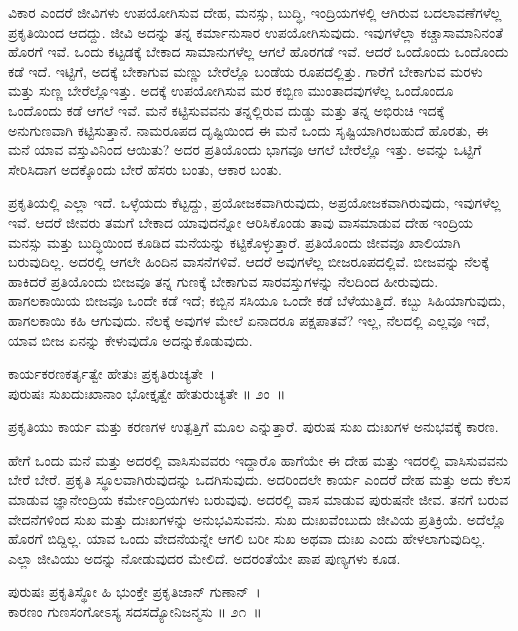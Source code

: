 ವಿಕಾರ ಎಂದರೆ ಜೀವಿಗಳು ಉಪಯೋಗಿಸುವ ದೇಹ, ಮನಸ್ಸು, ಬುದ್ಧಿ, ಇಂದ್ರಿಯಗಳಲ್ಲಿ ಆಗಿರುವ ಬದಲಾವಣೆಗಳೆಲ್ಲ ಪ್ರಕೃತಿಯಿಂದ ಆದದ್ದು. ಜೀವಿ ಅದನ್ನು ತನ್ನ ಕರ್ಮಾನುಸಾರ ಉಪಯೋಗಿಸುವುದು. ಇವುಗಳೆಲ್ಲಾ ಕಚ್ಚಾಸಾಮಾನಿನಂತೆ ಹೊರಗೆ ಇವೆ. ಒಂದು ಕಟ್ಟಡಕ್ಕೆ ಬೇಕಾದ ಸಾಮಾನುಗಳೆಲ್ಲ ಆಗಲೆ ಹೊರಗಡೆ ಇವೆ. ಆದರೆ ಒಂದೊಂದು ಒಂದೊಂದು ಕಡೆ ಇದೆ. ಇಟ್ಟಿಗೆ, ಅದಕ್ಕೆ ಬೇಕಾಗುವ ಮಣ್ಣು ಬೇರೆಲ್ಲೊ ಬಂಡೆಯ ರೂಪದಲ್ಲಿತ್ತು. ಗಾರೆಗೆ ಬೇಕಾಗುವ ಮರಳು ಮತ್ತು ಸುಣ್ಣ ಬೇರೆಲ್ಲೊಇತ್ತು. ಅದಕ್ಕೆ ಉಪಯೋಗಿಸುವ ಮರ ಕಬ್ಬಿಣ ಮುಂತಾದವುಗಳೆಲ್ಲ ಒಂದೊಂದೂ ಒಂದೊಂದು ಕಡೆ ಆಗಲೆ ಇವೆ. ಮನೆ ಕಟ್ಟಿಸುವವನು ತನ್ನಲ್ಲಿರುವ ದುಡ್ಡು ಮತ್ತು ತನ್ನ ಅಭಿರುಚಿ ಇದಕ್ಕೆ ಅನುಗುಣವಾಗಿ ಕಟ್ಟಿಸುತ್ತಾನೆ. ನಾಮರೂಪದ ದೃಷ್ಟಿಯಿಂದ ಈ ಮನೆ ಒಂದು ಸೃಷ್ಟಿಯಾಗಿರಬಹುದೆ ಹೊರತು, ಈ ಮನೆ ಯಾವ ವಸ್ತುವಿನಿಂದ ಆಯಿತು? ಅದರ ಪ್ರತಿಯೊಂದು ಭಾಗವೂ ಆಗಲೆ ಬೇರೆಲ್ಲೊ ಇತ್ತು. ಅವನ್ನು ಒಟ್ಟಿಗೆ ಸೇರಿಸಿದಾಗ ಅದಕ್ಕೊಂದು ಬೇರೆ ಹೆಸರು ಬಂತು, ಆಕಾರ ಬಂತು.

ಪ್ರಕೃತಿಯಲ್ಲಿ ಎಲ್ಲಾ ಇದೆ. ಒಳ್ಳೆಯದು ಕೆಟ್ಟದ್ದು, ಪ್ರಯೋಜಕವಾಗಿರುವುದು, ಅಪ್ರಯೋ\-ಜಕ\-ವಾಗಿರುವುದು, ಇವುಗಳೆಲ್ಲ ಇವೆ. ಆದರೆ ಜೀವರು ತಮಗೆ ಬೇಕಾದ ಯಾವುದನ್ನೋ ಆರಿಸಿಕೊಂಡು ತಾವು ವಾಸಮಾಡುವ ದೇಹ ಇಂದ್ರಿಯ ಮನಸ್ಸು ಮತ್ತು ಬುದ್ಧಿಯಿಂದ ಕೂಡಿದ ಮನೆಯನ್ನು ಕಟ್ಟಿಕೊಳ್ಳುತ್ತಾರೆ. ಪ್ರತಿಯೊಂದು ಜೀವವೂ ಖಾಲಿಯಾಗಿ ಬರುವುದಿಲ್ಲ. ಅದರಲ್ಲಿ ಆಗಲೇ ಹಿಂದಿನ ವಾಸನೆಗಳಿವೆ. ಆದರೆ ಅವುಗಳೆಲ್ಲ ಬೀಜರೂಪದಲ್ಲಿವೆ. ಬೀಜವನ್ನು ನೆಲಕ್ಕೆ ಹಾಕಿದರೆ ಪ್ರತಿಯೊಂದು ಬೀಜವೂ ತನ್ನ ಗುಣಕ್ಕೆ ಬೇಕಾಗುವ ಸಾರವಸ್ತುಗಳನ್ನು ನೆಲದಿಂದ ಹೀರುವುದು. ಹಾಗಲಕಾಯಿಯ ಬೀಜವೂ ಒಂದೇ ಕಡೆ ಇದೆ; ಕಬ್ಬಿನ ಸಸಿಯೂ ಒಂದೇ ಕಡೆ ಬೆಳೆಯುತ್ತಿದೆ. ಕಬ್ಬು ಸಿಹಿಯಾಗುವುದು, ಹಾಗಲಕಾಯಿ ಕಹಿ ಆಗುವುದು. ನೆಲಕ್ಕೆ ಅವುಗಳ ಮೇಲೆ ಏನಾದರೂ ಪಕ್ಷಪಾತವೆ? ಇಲ್ಲ, ನೆಲದಲ್ಲಿ ಎಲ್ಲವೂ ಇದೆ, ಯಾವ ಬೀಜ ಏನನ್ನು ಕೇಳುವುದೊ ಅದನ್ನು\break ಕೊಡುವುದು.

\begin{shloka}
ಕಾರ್ಯಕರಣಕರ್ತೃತ್ವೇ ಹೇತುಃ ಪ್ರಕೃತಿರುಚ್ಯತೇ~।\\ಪುರುಷಃ ಸುಖದುಃಖಾನಾಂ ಭೋಕ್ತೃತ್ವೇ ಹೇತುರುಚ್ಯತೇ \hfill॥ ೨ಂ~॥
\end{shloka}

\begin{artha}
ಪ್ರಕೃತಿಯು ಕಾರ್ಯ ಮತ್ತು ಕರಣಗಳ ಉತ್ಪತ್ತಿಗೆ ಮೂಲ ಎನ್ನುತ್ತಾರೆ. ಪುರುಷ ಸುಖ ದುಃಖಗಳ ಅನುಭವಕ್ಕೆ ಕಾರಣ.
\end{artha}

ಹೇಗೆ ಒಂದು ಮನೆ ಮತ್ತು ಅದರಲ್ಲಿ ವಾಸಿಸುವವರು ಇದ್ದಾರೊ ಹಾಗೆಯೇ ಈ ದೇಹ ಮತ್ತು ಇದರಲ್ಲಿ ವಾಸಿಸುವವನು ಬೇರೆ ಬೇರೆ. ಪ್ರಕೃತಿ ಸ್ಥೂಲವಾಗಿರುವುದನ್ನು ಒದಗಿಸುವುದು. ಅದರಿಂದಲೇ ಕಾರ್ಯ ಎಂದರೆ ದೇಹ ಮತ್ತು ಅದು ಕೆಲಸ ಮಾಡುವ ಜ್ಞಾನೇಂದ್ರಿಯ ಕರ್ಮೇಂದ್ರಿಯಗಳು ಬರುವುವು. ಅದರಲ್ಲಿ ವಾಸ ಮಾಡುವ ಪುರುಷನೇ ಜೀವ. ತನಗೆ ಬರುವ ವೇದನೆಗಳಿಂದ ಸುಖ ಮತ್ತು ದುಃಖಗಳನ್ನು ಅನುಭವಿಸುವನು. ಸುಖ ದುಃಖವೆಂಬುದು ಜೀವಿಯ ಪ್ರತಿಕ್ರಿಯೆ. ಅದೆಲ್ಲೊ ಹೊರಗೆ ಬಿದ್ದಿಲ್ಲ. ಯಾವ ಒಂದು ವೇದನೆಯನ್ನೇ ಆಗಲಿ ಬರೀ ಸುಖ ಅಥವಾ ದುಃಖ ಎಂದು ಹೇಳಲಾಗುವುದಿಲ್ಲ. ಎಲ್ಲಾ ಜೀವಿಯು ಅದನ್ನು ನೋಡುವುದರ ಮೇಲಿದೆ. ಅದರಂತೆಯೇ ಪಾಪ ಪುಣ್ಯಗಳು ಕೂಡ.

\begin{shloka}
ಪುರುಷಃ ಪ್ರಕೃತಿಸ್ಥೋ ಹಿ ಭುಂಕ್ತೇ ಪ್ರಕೃತಿಜಾನ್ ಗುಣಾನ್~।\\ಕಾರಣಂ ಗುಣಸಂಗೋಽಸ್ಯ ಸದಸದ್ಯೋನಿಜನ್ಮಸು \hfill॥ ೨೧~॥
\end{shloka}

